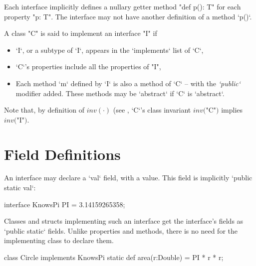
Each interface implicitly defines a nullary getter method
\xcd"def p(): T" for each property \xcd"p: T". The interface may not have
another definition of a method \xcd`p()`. 



A class \xcd"C" is said to implement an interface \xcd"I" if
\begin{itemize}
\item \xcd`I`, or a subtype of \xcd`I`, appears in the \xcd`implements` list
      of \xcd`C`, 
\item \xcd`C`'s properties include all the properties of \xcd"I",
\item Each method \xcd`m` defined by \xcd`I` is also a method of \xcd`C` --
      with the {\em  \xcd`public`} modifier added.   These methods may be
      \xcd`abstract` if \xcd`C` is \xcd`abstract`.
\end{itemize}

Note that, by definition of $\mathit{inv}(\cdot)$ (see , \xcd`C`'s class invariant $\mathit{inv}($\xcd"C"$)$ implies
$\mathit{inv}($\xcd"I"$)$.

\section{Field Definitions}

An interface may declare a \xcd`val` field, with a value.  This field is implicitly
\xcd`public static val`: 
\begin{xten}
interface KnowsPi {
  PI = 3.14159265358;
}
\end{xten}
%

Classes and structs implementing such an interface get the interface's fields as
\xcd`public static` fields.  Unlike properties and methods, there is no need
for the implementing class to declare them. 
\begin{xten}
class Circle implements KnowsPi {
  static def area(r:Double) = PI * r * r;
}
\end{xten}
%

